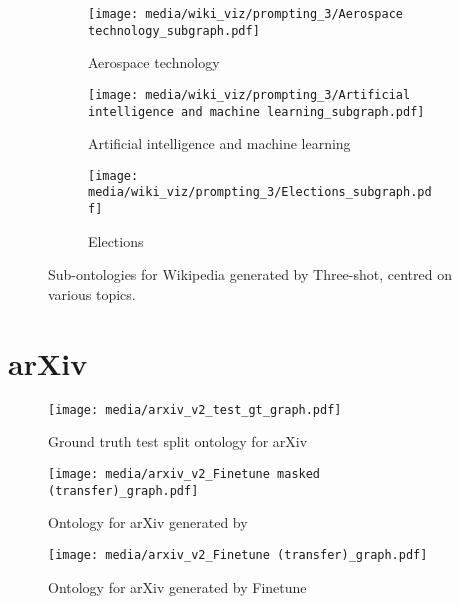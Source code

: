 \begin{figure}[H]
    \centering
    \begin{subfigure}{0.9\textwidth}
        \centering
        \texttt{[image: media/wiki\_viz/prompting\_3/Aerospace technology\_subgraph.pdf]}
        \caption{Aerospace technology}
    \end{subfigure}
    \begin{subfigure}{1.0\textwidth}
        \centering
        \texttt{[image: media/wiki\_viz/prompting\_3/Artificial intelligence and machine learning\_subgraph.pdf]}
        \caption{Artificial intelligence and machine learning}
    \end{subfigure}
    \begin{subfigure}{1.0\textwidth}
        \centering
        \texttt{[image: media/wiki\_viz/prompting\_3/Elections\_subgraph.pdf]}
        \caption{Elections}
        \label{fig:3shot-wiki-samples-election}
    \end{subfigure}
    \caption{Sub-ontologies for Wikipedia generated by Three-shot, centred on various topics.}
\end{figure}

\section{arXiv}  \label{appendix:viz-arxiv}

\begin{figure}[h]
    \centering
    \texttt{[image: media/arxiv\_v2\_test\_gt\_graph.pdf]}
    \caption{Ground truth test split ontology for arXiv}
\end{figure}


\begin{figure}[h]
    \centering
    \texttt{[image: media/arxiv\_v2\_Finetune masked (transfer)\_graph.pdf]}
    \caption{Ontology for arXiv generated by \name}
    \label{fig:ollm-arxiv}
\end{figure}


\begin{figure}[h]
    \centering
    \texttt{[image: media/arxiv\_v2\_Finetune (transfer)\_graph.pdf]}
    \caption{Ontology for arXiv generated by Finetune}
\end{figure}

